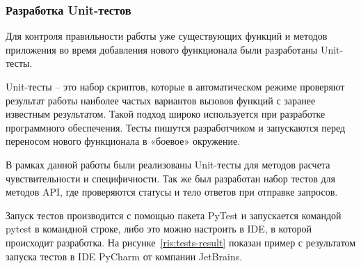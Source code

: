 \subsubsection{Разработка Unit-тестов}
Для контроля правильности работы уже существующих функций и методов приложения во время добавления нового функционала были разработаны Unit-тесты.
\par
Unit-тесты -- это набор скриптов, которые в автоматическом режиме проверяют результат работы наиболее частых вариантов вызовов функций с заранее известным результатом. Такой подход широко используется при разработке программного обеспечения. Тесты пишутся разработчиком и запускаются перед переносом нового функционала в «боевое» окружение.
\par
В рамках данной работы были реализованы Unit-тесты для методов расчета чувствительности и специфичности. Так же был разработан набор тестов для методов API, где проверяются статусы и тело ответов при отправке запросов.
\par
Запуск тестов производится с помощью пакета PyTest и запускается командой pytest в командной строке, либо это можно настроить в IDE, в которой происходит разработка. На рисунке~\ref{ris:tests-result} показан пример с результатом запуска тестов в IDE PyCharm от компании JetBrains.
